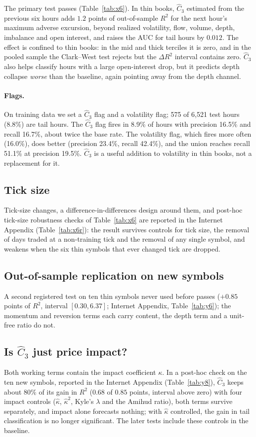 \documentclass[12pt]{article}
\theoremstyle{definition}
\theoremstyle{remark}
\begin{document}
The primary test passes (Table~\ref{tab:x6}). In thin books, $\hat C_3$ estimated from the previous six hours adds $1.2$ points of out-of-sample $R^2$ for the next hour's maximum adverse excursion, beyond realized volatility, flow, volume, depth, imbalance and open interest, and raises the AUC for tail hours by $0.012$. The effect is confined to thin books: in the mid and thick terciles it is zero, and in the pooled sample the Clark--West test rejects but the $\Delta R^2$ interval contains zero. $\hat C_3$ also helps classify hours with a large open-interest drop, but it predicts depth collapse \emph{worse} than the baseline, again pointing away from the depth channel.

\paragraph{Flags.} On training data we set a $\hat C_3$ flag and a volatility flag; 575 of 6{,}521 test hours (8.8\%) are tail hours. The $\hat C_3$ flag fires in 8.9\% of hours with precision 16.5\% and recall 16.7\%, about twice the base rate. The volatility flag, which fires more often (16.0\%), does better (precision 23.4\%, recall 42.4\%), and the union reaches recall 51.1\% at precision 19.5\%. $\hat C_3$ is a useful addition to volatility in thin books, not a replacement for it.

\subsection{Tick size}\label{sec:tick}
Tick-size changes, a difference-in-differences design around them, and post-hoc tick-size robustness checks of Table~\ref{tab:x6} are reported in the Internet Appendix (Table~\ref{tab:x6r}): the result survives controls for tick size, the removal of days traded at a non-training tick and the removal of any single symbol, and weakens when the six thin symbols that ever changed tick are dropped.

\subsection{Out-of-sample replication on new symbols}\label{sec:y6}
A second registered test on ten thin symbols never used before passes ($+0.85$ points of $R^2$, interval $[0.30,6.37]$; Internet Appendix, Table~\ref{tab:y6}); the momentum and reversion terms each carry content, the depth term and a unit-free ratio do not.

\subsection{Is $\hat C_3$ just price impact?}\label{sec:y8}
Both working terms contain the impact coefficient $\kappa$. In a post-hoc check on the ten new symbols, reported in the Internet Appendix (Table~\ref{tab:y8}), $\hat C_3$ keeps about 80\% of its gain in $R^2$ ($0.68$ of $0.85$ points, interval above zero) with four impact controls ($\hat\kappa$, $\hat\kappa^2$, Kyle's $\lambda$ and the Amihud ratio), both terms survive separately, and impact alone forecasts nothing; with $\hat\kappa$ controlled, the gain in tail classification is no longer significant. The later tests include these controls in the baseline.
\end{document}
